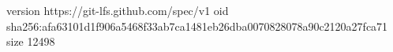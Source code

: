 version https://git-lfs.github.com/spec/v1
oid sha256:afa63101d1f906a5468f33ab7ca1481eb26dba0070828078a90c2120a27fca71
size 12498
